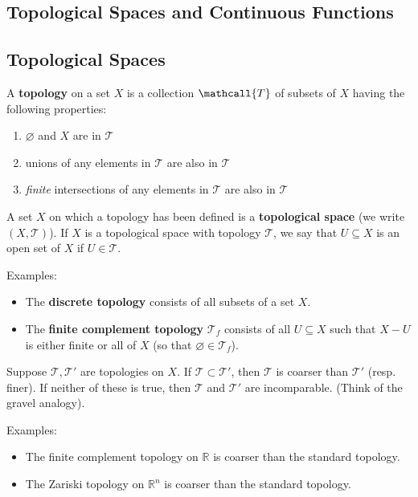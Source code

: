 \documentclass{article}
\newcommand{\nline}{\vspace*{0.5\baselineskip}}
\theoremstyle{definition}
\begin{document}
\begin{flushleft}

\setcounter{section}{1}

\section{Topological Spaces and Continuous Functions}

\subsection{Topological Spaces}

A \textbf{topology} on a set $X$ is a collection $\mathcall{T}$ of subsets of $X$ having the following properties:

\begin{enumerate}
    \item $\varnothing$ and $X$ are in $\mathcal{T}$
    \item unions of any elements in $\mathcal{T}$ are also in $\mathcal{T}$
    \item \textit{finite} intersections of any elements in $\mathcal{T}$ are also in $\mathcal{T}$
\end{enumerate}

A set $X$ on which a topology has been defined is a \textbf{topological space} (we write $(X, \mathcal{T})$). If $X$ is a topological space with topology $\mathcal{T}$, we say that $U \subseteq X$ is an open set of $X$ if $U \in \mathcal{T}$.

\nline

Examples:

\begin{itemize}
    \item The \textbf{discrete topology} consists of all subsets of a set $X$.
    \item The \textbf{finite complement topology} $\mathcal{T}_f$ consists of all $U \subseteq X$ such that $X - U$ is either finite or all of $X$ (so that $\varnothing \in \mathcal{T}_f$).
\end{itemize}

Suppose $\mathcal{T}, \mathcal{T}'$ are topologies on $X$. If $\mathcal{T} \subset \mathcal{T}'$, then $\mathcal{T}$ is coarser than $\mathcal{T}'$ (resp. finer). If neither of these is true, then $\mathcal{T}$ and $\mathcal{T}'$ are incomparable. (Think of the gravel analogy).

Examples:

\begin{itemize}
    \item The finite complement topology on $\mathbb{R}$ is coarser than the standard topology.
    \item The Zariski topology on $\mathbb{R}^n$ is coarser than the standard topology.
\end{itemize}


\end{flushleft}
\end{document}
